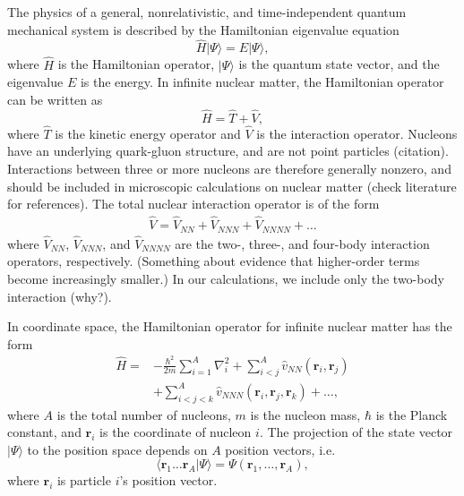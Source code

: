 \documentclass[a4paper,12pt]{report}
\begin{document}
The physics of a general, nonrelativistic, and time-independent quantum mechanical system is described by the Hamiltonian eigenvalue equation 
\begin{equation} \label{eq:ham_eq}
  \hat{H}| \Psi \rangle = E| \Psi \rangle ,
\end{equation}
where $\hat{H}$ is the Hamiltonian operator, $| \Psi \rangle$ is the quantum state vector, and the eigenvalue $E$ is the energy. In infinite nuclear matter, the Hamiltonian operator can be written as
\begin{equation}
  \hat{H} = \hat{T} + \hat{V},
\end{equation}
where $\hat{T}$ is the kinetic energy operator and $\hat{V}$ is the interaction operator. Nucleons have an underlying quark-gluon structure, and are not point particles (citation). Interactions between three or more nucleons are therefore generally nonzero, and should be included in microscopic calculations on nuclear matter (check literature for references). The total nuclear interaction operator is of the form
\begin{align}
  \hat{V} = \hat{V}_{NN} + \hat{V}_{NNN} + \hat{V}_{NNNN} + \dots 
\end{align}
where $\hat{V}_{NN}$, $\hat{V}_{NNN}$, and $\hat{V}_{NNNN}$ are the two-, three-, and four-body interaction operators, respectively. (Something about evidence that higher-order terms become increasingly smaller.) In our calculations, we include only the two-body interaction (why?). 

In coordinate space, the Hamiltonian operator for infinite nuclear matter has the form
\begin{align} \label{eq:hamilt}
  \hat{H} =& -\frac{\hbar^{2}}{2m}\sum_{i=1}^{A}\nabla_{i}^{2} + \sum_{i<j}^{A}\hat{v}_{NN}(\mathbf{r}_{i}, \mathbf{r}_{j}) \nonumber \\
  & + \sum_{i<j<k}^{A}\hat{v}_{NNN}(\mathbf{r}_{i}, \mathbf{r}_{j}, \mathbf{r}_{k}) + \dots ,
\end{align}
where $A$ is the total number of nucleons, $m$ is the nucleon mass, $\hbar $ is the Planck constant, and $\mathbf{r}_{i}$ is the coordinate of nucleon $i$. The projection of the state vector $| \Psi \rangle $ to the position space depends on $A$ position vectors, i.e.
\begin{equation}
  \langle \mathbf{r}_{1}\dots \mathbf{r}_{A}| \Psi \rangle = \Psi(\mathbf{r}_{1}, \dots , \mathbf{r}_{A}),
\end{equation}
where $\mathbf{r}_{i}$ is particle $i$'s position vector.
\end{document}
